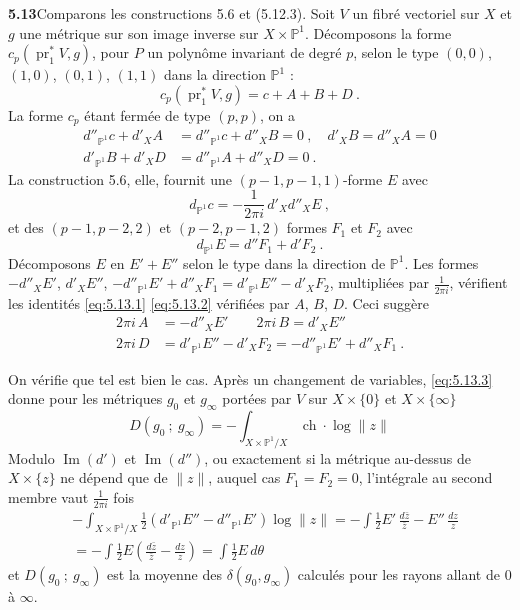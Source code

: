 \documentclass[12pt,a4paper]{article}
\theoremstyle{plain}
\theoremstyle{definition}
\theoremstyle{remark}
\DeclareMathOperator{\ch}{ch}
\DeclareMathOperator{\Imagem}{Im}
\newcommand{\bbP}{\mathbb{P}}
\DeclareMathOperator{\pr}{pr}
\begin{document}
\setcounter{section}{5}


\noindent\textbf{5.13}\quad Comparons les constructions 5.6 et (5.12.3). Soit $V$ un fibr\'e vectoriel sur $X$ et $g$ une m\'etrique sur son image inverse sur $X \times \bbP^1$. D\'ecomposons la forme $c_p(\pr_1^*V, g)$, pour $P$ un polyn\^ome invariant de degr\'e $p$, selon le type $(0,0)$, $(1,0)$, $(0,1)$, $(1,1)$ dans la direction $\bbP^1$ :
\[
c_p(\pr_1^*V, g) = c + A + B + D \ .
\]
La forme $c_p$ \'etant ferm\'ee de type $(p,p)$, on a
\begin{align}
\label{eq:5.13.1}
d''_{\bbP^1}c + d'_X A &= d''_{\bbP^1} c + d''_X B = 0 \ , \quad d'_X B = d''_X A = 0 \\
\label{eq:5.13.2}
d'_{\bbP^1} B + d'_X D &= d''_{\bbP^1} A + d''_X D = 0 \ .
\end{align}
La construction 5.6, elle, fournit une $(p-1, p-1, 1)$-forme $E$ avec
\begin{equation}
\label{eq:5.13.3}
d_{\bbP^1} c = -\frac{1}{2\pi i} \, d'_X d''_X E \ ,
\end{equation}
et des $(p-1, p-2, 2)$ et $(p-2, p-1, 2)$ formes $F_1$ et $F_2$ avec
\begin{equation}
\label{eq:5.13.4}
d_{\bbP^1} E = d''F_1 + d'F_2 \ .
\end{equation}
D\'ecomposons $E$ en $E' + E''$ selon le type dans la direction de $\bbP^1$. Les formes $-d''_X E'$, $d'_X E''$, $-d''_{\bbP^1}E' + d''_X F_1 = d'_{\bbP^1}E'' - d'_X F_2$, multipli\'ees par $\frac{1}{2\pi i}$, v\'erifient les identit\'es \eqref{eq:5.13.1} \eqref{eq:5.13.2} v\'erifi\'ees par $A$, $B$, $D$. Ceci sugg\`ere
\begin{equation}
\label{eq:5.13.5}
\begin{aligned}
2\pi i \, A &= -d''_X E' \qquad 2\pi i \, B = d'_X E'' \\
2\pi i \, D &= d'_{\bbP^1}E'' - d'_X F_2 = -d''_{\bbP^1}E' + d''_X F_1 \ .
\end{aligned}
\end{equation}

On v\'erifie que tel est bien le cas. Apr\`es un changement de variables, \eqref{eq:5.13.3} donne pour les m\'etriques $g_0$ et $g_\infty$ port\'ees par $V$ sur $X \times \{0\}$ et $X \times \{\infty\}$
\[
D(g_0 \ ; \ g_\infty) = -\int_{X \times \bbP^1/X} \ch \cdot \log \|z\|
\]
Modulo $\Imagem(d')$ et $\Imagem(d'')$, ou exactement si la m\'etrique au-dessus de $X \times \{z\}$ ne d\'epend que de $\|z\|$, auquel cas $F_1 = F_2 = 0$, l'int\'egrale au second membre vaut $\frac{1}{2\pi i}$ fois
\begin{align*}
&-\int_{X \times \bbP^1/X} \tfrac{1}{2}(d'_{\bbP^1}E'' - d''_{\bbP^1}E') \log \|z\| = -\int \tfrac{1}{2} E' \, \frac{d\bar z}{\bar z} - E'' \, \frac{dz}{z} \\
&= -\int \tfrac{1}{2} E \left(\frac{d\bar z}{\bar z} - \frac{dz}{z}\right) = \int \tfrac{1}{2} E \, d\theta
\end{align*}
et $D(g_0 \ ; \ g_\infty)$ est la moyenne des $\delta(g_0, g_\infty)$ calcul\'es pour les rayons allant de $0$ \`a $\infty$.
\end{document}
